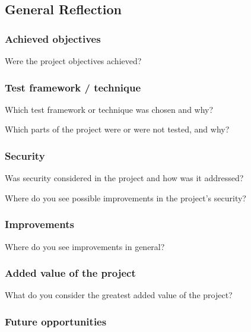 \subsection{General Reflection}

\subsubsection{Achieved objectives}

Were the project objectives achieved? \label{q} \newline


\subsubsection{Test framework / technique}

Which test framework or technique was chosen and why? \label{q} \newline

Which parts of the project were or were not tested, and why? \label{q} \newline


\subsubsection{Security}

Was security considered in the project and how was it addressed? \label{q} \newline

Where do you see possible improvements in the project’s security? \label{q} \newline


\subsubsection{Improvements}

Where do you see improvements in general? \label{q} \newline


\subsubsection{Added value of the project}

What do you consider the greatest added value of the project? \label{q} \newline


\subsubsection{Future opportunities}

